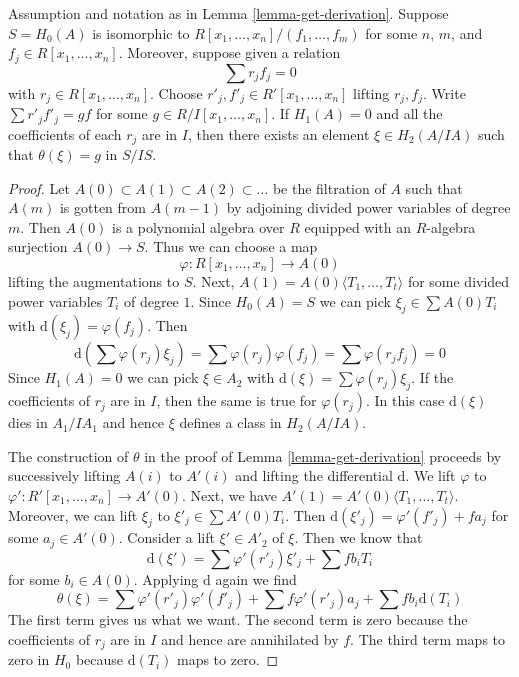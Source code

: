 \begin{lemma}
\label{lemma-compute-theta}
Assumption and notation as in Lemma \ref{lemma-get-derivation}.
Suppose $S = H_0(A)$ is isomorphic to
$R[x_1, \ldots, x_n]/(f_1, \ldots, f_m)$
for some $n$, $m$, and $f_j \in R[x_1, \ldots, x_n]$.
Moreover, suppose given a relation
$$
\sum r_j f_j = 0
$$
with $r_j \in R[x_1, \ldots, x_n]$.
Choose $r'_j, f'_j \in R'[x_1, \ldots, x_n]$ lifting $r_j, f_j$.
Write $\sum r'_j f'_j = gf$ for some $g \in R/I[x_1, \ldots, x_n]$.
If $H_1(A) = 0$ and all the coefficients of each $r_j$ are in $I$, then
there exists an element $\xi \in H_2(A/IA)$ such that
$\theta(\xi) = g$ in $S/IS$.
\end{lemma}

\begin{proof}
Let $A(0) \subset A(1) \subset A(2) \subset \ldots$ be the filtration
of $A$ such that $A(m)$ is gotten from $A(m - 1)$ by adjoining divided
power variables of degree $m$. Then $A(0)$ is a polynomial algebra
over $R$ equipped with an $R$-algebra surjection $A(0) \to S$.
Thus we can choose a map
$$
\varphi : R[x_1, \ldots, x_n] \to A(0)
$$
lifting the augmentations to $S$.
Next, $A(1) = A(0)\langle T_1, \ldots, T_t \rangle$ for some divided
power variables $T_i$ of degree $1$. Since $H_0(A) = S$ we
can pick $\xi_j \in \sum A(0)T_i$ with $\text{d}(\xi_j) = \varphi(f_j)$.
Then
$$
\text{d}\left(\sum \varphi(r_j) \xi_j\right) =
\sum  \varphi(r_j) \varphi(f_j) =  \sum \varphi(r_jf_j) = 0
$$
Since $H_1(A) = 0$ we can pick $\xi \in A_2$ with
$\text{d}(\xi) = \sum \varphi(r_j) \xi_j$.
If the coefficients of $r_j$ are in $I$, then the same
is true for $\varphi(r_j)$. In this case
$\text{d}(\xi)$ dies in $A_1/IA_1$ and
hence $\xi$ defines a class in $H_2(A/IA)$.

\medskip\noindent
The construction of $\theta$ in the proof of Lemma \ref{lemma-get-derivation}
proceeds by successively lifting $A(i)$ to $A'(i)$ and lifting the
differential $\text{d}$. We lift $\varphi$
to $\varphi' : R'[x_1, \ldots, x_n] \to A'(0)$.
Next, we have $A'(1) = A'(0)\langle T_1, \ldots, T_t\rangle$.
Moreover, we can lift $\xi_j$ to $\xi'_j \in \sum A'(0)T_i$.
Then $\text{d}(\xi'_j) = \varphi'(f'_j) + f a_j$ for some
$a_j \in A'(0)$.
Consider a lift $\xi' \in A'_2$ of $\xi$.
Then we know that
$$
\text{d}(\xi') = \sum \varphi'(r'_j)\xi'_j + \sum fb_iT_i
$$
for some $b_i \in A(0)$. Applying $\text{d}$ again we find
$$
\theta(\xi) = \sum \varphi'(r'_j)\varphi'(f'_j) +
\sum f \varphi'(r'_j) a_j + \sum fb_i \text{d}(T_i)
$$
The first term gives us what we want. The second term is zero
because the coefficients of $r_j$ are in $I$ and hence are
annihilated by $f$. The third term maps to zero in $H_0$
because $\text{d}(T_i)$ maps to zero.
\end{proof}

